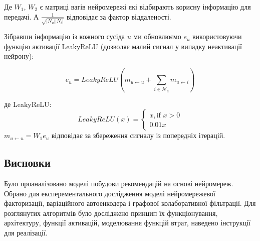 Де $W_1$, $W_2$ є матриці вагів нейромережі які відбирають корисну інформацію для передачі. А $\frac{1}{\sqrt{|N_{u}| |{N_{i}|}}}$ відповідає за 
фактор віддаленості.

Зібравши інформацію із кожного сусіда $u$ ми обновлюємо $e_u$ використовуючи функцію активації LeakyReLU (дозволяє малий сигнал у випадку неактивації нейрону): 

\[  e_u = LeakyReLU(m_{u \leftarrow u} + \sum_{i \in \mathcal{N}_u} m_{u \leftarrow i})\]

де LeakyReLU:
\[ LeakyReLU(x) = \begin{cases}
    x, \text{if $x > 0$} \\
    0.01 x
\end{cases}\]
$m_{u \leftarrow u} = W_1 e_u$ відповідає за збереження сигналу із попередніх ітерацій.
\subsection*{Висновки}
Було проаналізовано моделі побудови рекомендацій на основі нейромереж. 
Обрано для експерементального дослідження моделі нейромережевої факторизації, варіаційного автоенкодера і графової колаборативної фільтрації. Для розглянутих алгоритмів було досліджено принцип їх функціонування, архітектуру, функції активацій, моделювання функцій втрат,  наведено інструкції для реалізації.